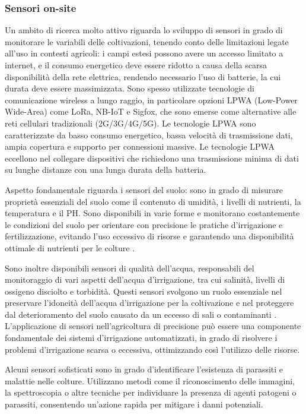 \documentclass[12pt,a4paper,openright,twoside]{book}
\begin{document}
\subsubsection{Sensori on-site}

Un ambito di ricerca molto attivo riguarda lo sviluppo di sensori in grado di monitorare le variabili delle coltivazioni, tenendo conto delle limitazioni legate all'uso in contesti agricoli: i campi estesi possono avere un accesso limitato a internet, e il consumo energetico deve essere ridotto a causa della scarsa disponibilità della rete elettrica, rendendo necessario l'uso di batterie, la cui durata deve essere massimizzata\cite{s24082647}.
Sono spesso utilizzate tecnologie di comunicazione wireless a lungo raggio, in particolare opzioni LPWA (Low-Power Wide-Area) come LoRa, NB-IoT e Sigfox, che sono emerse come alternative alle reti cellulari tradizionali (2G/3G/4G/5G)\cite{bhoyar2019communication}. Le tecnologie LPWA sono caratterizzate da basso consumo energetico, bassa velocità di trasmissione dati, ampia copertura e supporto per connessioni massive. Le tecnologie LPWA eccellono nel collegare dispositivi che richiedono una trasmissione minima di dati su lunghe distanze con una lunga durata della batteria\cite{dai2019low}.

Aspetto fondamentale riguarda i sensori del suolo: sono in grado di misurare proprietà essenziali del suolo come il contenuto di umidità, i livelli di nutrienti, la temperatura e il PH. Sono disponibili in varie forme e monitorano costantemente le condizioni del suolo per orientare con precisione le pratiche d'irrigazione e fertilizzazione, evitando l'uso eccessivo di risorse e garantendo una disponibilità ottimale di nutrienti per le colture \cite{vuran2018internet}.

Sono inoltre disponibili sensori di qualità dell'acqua, responsabili del monitoraggio di vari aspetti dell'acqua d'irrigazione, tra cui salinità, livelli di ossigeno disciolto e torbidità. Questi sensori svolgono un ruolo essenziale nel preservare l'idoneità dell'acqua d'irrigazione per la coltivazione e nel proteggere dal deterioramento del suolo causato da un eccesso di sali o contaminanti \cite{garcia2020iot}.
L'applicazione di sensori nell'agricoltura di precisione può essere una componente fondamentale dei sistemi d'irrigazione automatizzati, in grado di risolvere i problemi d'irrigazione scarsa o eccessiva, ottimizzando così l'utilizzo delle risorse.

Alcuni sensori sofisticati sono in grado d'identificare l'esistenza di parassiti e malattie nelle colture. Utilizzano metodi come il riconoscimento delle immagini, la spettroscopia o altre tecniche per individuare la presenza di agenti patogeni o parassiti, consentendo un'azione rapida per mitigare i danni potenziali\cite{che2022mobile}.
\end{document}
